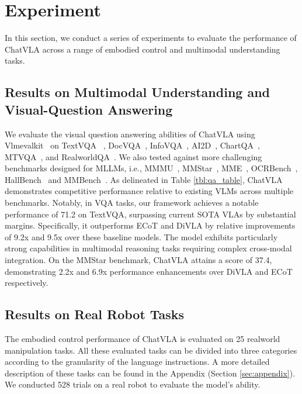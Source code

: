
\section{Experiment}
\label{sec:exp}
In this section, we conduct a series of experiments to evaluate the performance of ChatVLA across a range of embodied control and multimodal understanding tasks. 


\subsection{Results on Multimodal Understanding and Visual-Question Answering}

We evaluate the visual question answering abilities of ChatVLA using Vlmevalkit~\cite{duan2024vlmevalkit}  on TextVQA ~\cite{singh2019towards}, DocVQA~\cite{mathew2021docvqa}, InfoVQA~\cite{9706887}, AI2D~\cite{kembhavi2016diagram}, ChartQA~\cite{masry-etal-2022-chartqa}, MTVQA~\cite{tang2024mtvqa}, and RealworldQA~\cite{RealWorldQA}.
We also tested against more challenging benchmarks designed for MLLMs, i.e.,
MMMU~\cite{yue2023mmmu}, MMStar~\cite{chen2024we}, MME~\cite{mme}, OCRBench~\cite{Liu_2024}, HallBench~\cite{Guan_2024_CVPR} and MMBench~\cite{mmbench}. 
As delineated in Table \ref{tbl:qa_table}, ChatVLA demonstrates competitive performance relative to existing VLMs across multiple benchmarks. Notably, in VQA tasks, our framework achieves a notable performance of 71.2 on TextVQA, surpassing current SOTA VLAs by substantial margins. Specifically, it outperforms ECoT and DiVLA by relative improvements of 9.2x and 9.5x over these baseline models. The model exhibits particularly strong capabilities in multimodal reasoning tasks requiring complex cross-modal integration. On the MMStar benchmark, ChatVLA attains a score of 37.4, demonstrating 2.2x and 6.9x performance enhancements over DiVLA and ECoT respectively. 


\subsection{Results on Real Robot Tasks}

The embodied control performance of ChatVLA is evaluated on 25 realworld manipulation tasks. All these evaluated tasks can be divided into three categories according to the granularity of the language instructions. A more detailed description of these tasks can be found in the Appendix (Section \ref{sec:appendix}). We conducted 528 trials on a real robot to evaluate the model's ability.

